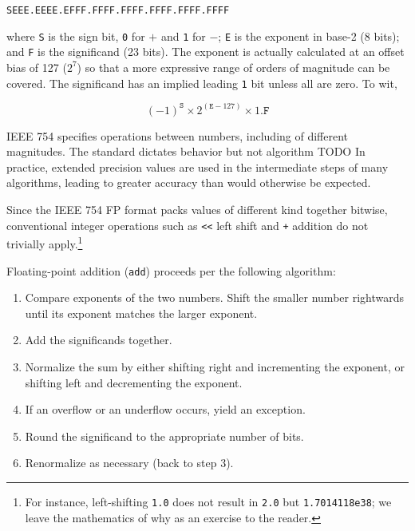 \documentclass[twoside]{article}
\begin{document}
\begin{lstlisting}
SEEE.EEEE.EFFF.FFFF.FFFF.FFFF.FFFF.FFFF
\end{lstlisting}

where \texttt{S} is the sign bit, \texttt{0} for $+$ and \texttt{1} for $-$; \texttt{E} is the exponent in base-2 (8 bits); and \texttt{F} is the significand (23 bits).  The exponent is actually calculated at an offset bias of 127 ($2^{7}$) so that a more expressive range of orders of magnitude can be covered.  The significand has an implied leading \texttt{1} bit unless all are zero.  To wit,

$$
(-1)^{\texttt{S}} \times 2^(\texttt{E}-127) \times 1.\texttt{F}
$$

IEEE 754 specifies operations between numbers, including of different magnitudes.  The standard dictates behavior but not algorithm TODO
In practice, extended precision values are used in the intermediate steps of many algorithms, leading to greater accuracy than would otherwise be expected.

Since the IEEE 754 FP format packs values of different kind together bitwise, conventional integer operations such as \texttt{<<} left shift and \texttt{+} addition do not trivially apply.\footnote{For instance, left-shifting \texttt{1.0} does not result in \texttt{2.0} but \texttt{1.7014118e38}; we leave the mathematics of why as an exercise to the reader.}

Floating-point addition (\texttt{add}) proceeds per the following algorithm:

\begin{enumerate}
  \item  Compare exponents of the two numbers.  Shift the smaller number rightwards until its exponent matches the larger exponent.
  \item  Add the significands together.
  \item  Normalize the sum by either shifting right and incrementing the exponent, or shifting left and decrementing the exponent.
  \item  If an overflow or an underflow occurs, yield an exception.
  \item  Round the significand to the appropriate number of bits.
  \item  Renormalize as necessary (back to step 3).
\end{enumerate}
\end{document}

